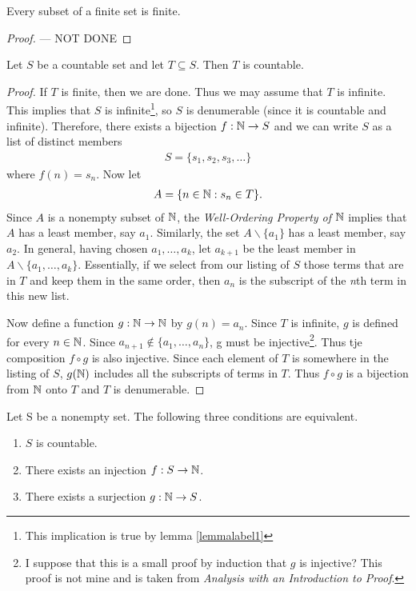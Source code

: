 \begin{lemma}
	\label{lemmalabel1}
	Every subset of a finite set is finite.
\end{lemma}

\begin{proof}
	--- NOT DONE
\end{proof}


\begin{theorem}
	\label{theolabel3}
	Let $S$ be a countable set and let $T\subseteq S$. Then $T$ is countable.
\end{theorem}

\begin{proof}
	If $T$ is finite, then we are done. Thus we may assume that $T$ is infinite. This implies that $S$ is infinite\footnote{This implication is true by lemma \ref{lemmalabel1}}, so $S$ is denumerable (since it is countable and infinite). Therefore, there exists a bijection $f:\mathbb{N}\rightarrow S$ and we can write $S$ as a list of distinct members
	\begin{align*}
		S=\{s_1,s_2,s_3,\hdots\}
	\end{align*}
	where $f(n)=s_n$. Now let
	\begin{align*}
		A=\{n\in\mathbb{N}:s_n\in T\}.
	\end{align*}
	Since $A$ is a nonempty subset of $\mathbb{N}$, the \textit{Well-Ordering Property of $\mathbb{N}$} implies that $A$ has a least member, say $a_1$. Similarly, the set $A\backslash \{a_1\}$ has a least member, say $a_2$. In general, having chosen $a_1,\hdots,a_k$, let $a_{k+1}$ be the least member in $A\backslash \{a_1,\hdots,a_k\}$. Essentially, if we select from our listing of $S$ those terms that are in $T$ and keep them in the same order, then $a_n$ is the subscript of the \textit{n}th term in this new list.
	
	Now define a function $g:\mathbb{N}\rightarrow\mathbb{N}$ by $g(n)=a_n$. Since $T$ is infinite, $g$ is defined for every $n\in\mathbb{N}$. Since $a_{n+1}\notin \{a_1,\hdots,a_n\}$, g must be injective\footnote{I suppose that this is a small proof by induction that $g$ is injective? This proof is not mine and is taken from \textit{Analysis with an Introduction to Proof}.}. Thus tje composition $f\circ g$ is also injective. Since each element of $T$ is somewhere in the listing of $S$, $g(\mathbb{N})$ includes all the subscripts of terms in $T$. Thus $f\circ g$ is a bijection from $\mathbb{N}$ onto $T$ and $T$ is denumerable.
\end{proof}

\begin{theorem}
	Let S be a nonempty set. The following three conditions are equivalent.
	\begin{enumerate}
		\item $S$ is countable.
		\item There exists an injection $f:S\rightarrow \mathbb{N}$.
		\item There exists a surjection $g:\mathbb{N}\rightarrow S$.
	\end{enumerate}
\end{theorem}


